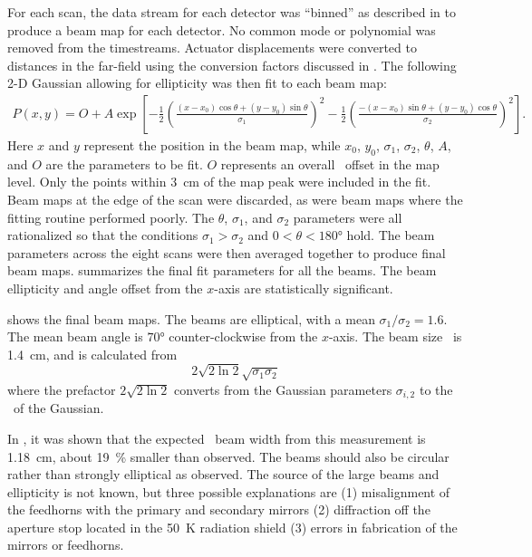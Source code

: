 For each scan, the data stream for each detector was ``binned'' as described in  to produce a beam map for each detector.
No common mode or polynomial was removed from the timestreams.
Actuator displacements were converted to distances in the far-field using the conversion factors discussed in .
The following 2-D Gaussian allowing for ellipticity was then fit to each beam map:
\begin{multline}
  P(x,y) = O + A \exp{ \left[  - \frac{1}{2} \left( \frac{ (x-x_0) \cos{\theta} + (y-y_0) \sin{\theta}}{\sigma_1} \right)^2 
                               - \frac{1}{2} \left( \frac{-(x-x_0) \sin{\theta} + (y-y_0) \cos{\theta}}{\sigma_2} \right)^2
                       \right] }.
\end{multline}
Here $x$ and $y$ represent the position in the beam map, while $x_0$, $y_0$, $\sigma_1$, $\sigma_2$, $\theta$, $A$, and $O$ are the parameters to be fit.
$O$ represents an overall \DC\ offset in the map level.
Only the points within \SI{3}{\cm} of the map peak were included in the fit.
Beam maps at the edge of the scan were discarded, as were beam maps where the fitting routine performed poorly.
The $\theta$, $\sigma_1$, and $\sigma_2$ parameters were all rationalized so that the conditions $\sigma_1 > \sigma_2$ and $0 < \theta < \ang{180}$ hold.
The beam parameters across the eight scans were then averaged together to produce final beam maps.
 summarizes the final fit parameters for all the beams.
The beam ellipticity and angle offset from the $x$-axis are statistically significant.

 shows the final beam maps.
The beams are elliptical, with a mean $\sigma_1 / \sigma_2 = 1.6$.
The mean beam angle is $\ang{70}$ counter-clockwise from the $x$-axis.
The beam size \FWHM\ is \SI{1.4}{\cm}, and is calculated from
\begin{equation}
  2 \sqrt{2 \ln{2}} \sqrt{\sigma_1 \sigma_2}
\end{equation}
where the prefactor $2 \sqrt{2 \ln{2}}$ converts from the Gaussian parameters $\sigma_{i,2}$ to the \FWHM\ of the Gaussian.

In , it was shown that the expected \FWHM\ beam width from this measurement is \SI{1.18}{\cm}, about \SI{19}{\percent} smaller than observed.
The beams should also be circular rather than strongly elliptical as observed.
The source of the large beams and ellipticity is not known, but three possible explanations are (1) misalignment of the feedhorns with the primary and secondary mirrors (2) diffraction off the aperture stop located in the \SI{50}{\kelvin} radiation shield (3) errors in fabrication of the mirrors or feedhorns.

